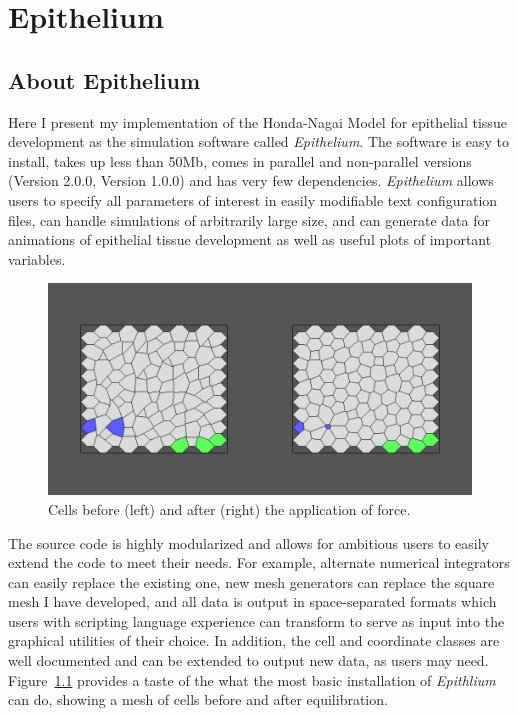 \chapter{Epithelium}

\section{About Epithelium}
Here I present my implementation of the Honda-Nagai Model for epithelial tissue development as the simulation software called \emph{Epithelium}. The software is easy to install, takes up less than 50Mb, comes in parallel and non-parallel versions (Version 2.0.0, Version 1.0.0) and has very few dependencies. \emph{Epithelium} allows users to specify all parameters of interest in easily modifiable text configuration files, can handle simulations of arbitrarily large size, and can generate data for animations of epithelial tissue development as well as useful plots of important variables. 
\begin{figure}
\centering
\includegraphics[width=\textwidth]{../diagrams/BeforeAfter.png}
\caption{Cells before (left) and after (right) the application of force.}
\label{fig:beforeafter}
\end{figure}
The source code is highly modularized and allows for ambitious users to easily extend the code to meet their needs. For example, alternate numerical integrators can easily replace the existing one, new mesh generators can replace the square mesh I have developed, and all data is output in space-separated formats which users with scripting language experience can transform to serve as input into the graphical utilities of their choice. In addition, the cell and coordinate classes are well documented and can be extended to output new data, as users may need. Figure~\ref{fig:beforeafter} provides a taste of the what the most basic installation of \emph{Epithlium} can do, showing a mesh of cells before and after equilibration.

